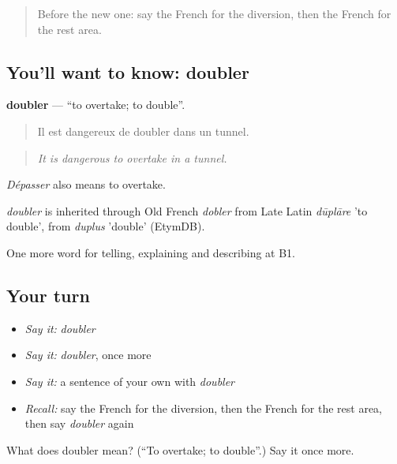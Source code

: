 \label{lesson:FR-C410-doubler}



\begin{quote}
Before the new one: say the French for the diversion, then the French for the rest area.
\end{quote}

\subsection*{You'll want to know: doubler}
\textbf{doubler} — \textquotedblleft{}to overtake; to double\textquotedblright{}.

\begin{quote}
Il est dangereux de doubler dans un tunnel.
\end{quote}

\begin{quote}
\emph{It is dangerous to overtake in a tunnel.}
\end{quote}

\emph{Dépasser} also means to overtake.

\begin{cousinweb}
\emph{doubler} is inherited through Old French \emph{dobler} from Late Latin \emph{dūplāre} 'to double', from \emph{duplus} 'double' (EtymDB).
\end{cousinweb}

\begin{grammarlens}[title={What you've built}]
One more word for telling, explaining and describing at B1.
\end{grammarlens}

\subsection*{Your turn}
\begin{itemize}
\raggedright
  \item \emph{Say it:} \emph{doubler}
  \item \emph{Say it:} \emph{doubler}, once more
  \item \emph{Say it:} a sentence of your own with \emph{doubler}
  \item \emph{Recall:} say the French for the diversion, then the French for the rest area, then say \emph{doubler} again
\end{itemize}

\begin{tcolorbox}[breakable,colback=teal!4,colframe=teal!35!black,title={Before you move on}]
What does doubler mean? (\textquotedblleft{}To overtake; to double\textquotedblright{}.) Say it once more.
\end{tcolorbox}
